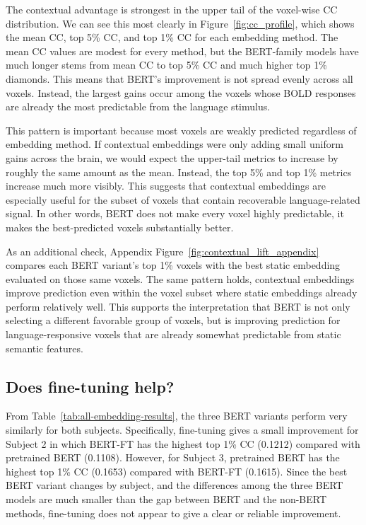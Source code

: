 \documentclass[11pt]{article}
\begin{document}
The contextual advantage is strongest in the upper tail of the voxel-wise CC distribution. We can see this most clearly in Figure~\ref{fig:cc_profile}, which shows the mean CC, top 5\% CC, and top 1\% CC for each embedding method. The mean CC values are modest for every method, but the BERT-family models have much longer stems from mean CC to top 5\% CC and much higher top 1\% diamonds. This means that BERT's improvement is not spread evenly across all voxels. Instead, the largest gains occur among the voxels whose BOLD responses are already the most predictable from the language stimulus.

This pattern is important because most voxels are weakly predicted regardless of embedding method. If contextual embeddings were only adding small uniform gains across the brain, we would expect the upper-tail metrics to increase by roughly the same amount as the mean. Instead, the top 5\% and top 1\% metrics increase much more visibly. This suggests that contextual embeddings are especially useful for the subset of voxels that contain recoverable language-related signal. In other words, BERT does not make every voxel highly predictable, it makes the best-predicted voxels substantially better.

As an additional check, Appendix Figure~\ref{fig:contextual_lift_appendix} compares each BERT variant's top 1\% voxels with the best static embedding evaluated on those same voxels. The same pattern holds, contextual embeddings improve prediction even within the voxel subset where static embeddings already perform relatively well. This supports the interpretation that BERT is not only selecting a different favorable group of voxels, but is improving prediction for language-responsive voxels that are already somewhat predictable from static semantic features.

\subsection{Does fine-tuning help?}
From Table~\ref{tab:all-embedding-results}, the three BERT variants perform very similarly for both subjects. Specifically, fine-tuning gives a small improvement for Subject 2 in which BERT-FT has the highest top 1\% CC (0.1212) compared with pretrained BERT (0.1108). However, for Subject 3, pretrained BERT has the highest top 1\% CC (0.1653) compared with BERT-FT (0.1615). Since the best BERT variant changes by subject, and the differences among the three BERT models are much smaller than the gap between BERT and the non-BERT methods, fine-tuning does not appear to give a clear or reliable improvement.
\end{document}
